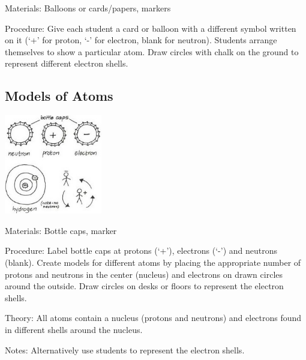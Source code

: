 \begin{multicols}{2}
\begin{description*}
\item[Materials:]{Balloons or cards/papers, markers}
\item[Procedure:]{Give each student a card or balloon with a different symbol written on it (`+' for proton, `-' for electron, blank for neutron). Students arrange themselves to show a particular atom. Draw circles with chalk on the ground to represent different electron shells.}
\end{description*}

\subsection{Models of Atoms}

\begin{center}
\includegraphics[width=0.32\textwidth]{./img/vso/atom-model.jpg}
\end{center}

\begin{description*}
\item[Materials:]{Bottle caps, marker}
\item[Procedure:]{Label bottle caps at protons (`+'), electrons (`-') and neutrons (blank). Create models for different atoms by placing the appropriate number of protons and neutrons in the center (nucleus) and electrons on drawn circles around the outside. Draw circles on desks or
floors to represent the electron
shells. }
\item[Theory:]{All atoms contain a nucleus
(protons and neutrons) and
electrons found in different shells around the nucleus. }
\item[Notes:]{Alternatively use students
to represent the electron shells.}
\end{description*}


\end{multicols}
